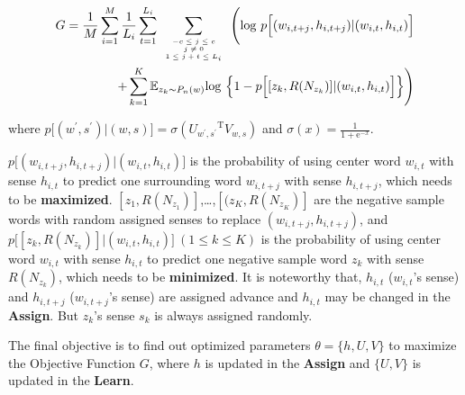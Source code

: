 \begin{equation}
\begin{split}
G = \frac{1}{M}\sum_{i=1}^M\frac{1}{L_i}\sum_{t=1}^{L_i}\sum\limits_{\mbox{\tiny$\begin{array}{c}-c\leq j \leq c\\ j\neq 0\\ 1\leq j+t\leq L_i\end{array}$}}\Bigg (\mathrm{log}\ p\Big [(w_{i,t+j},h_{i,t+j})|(w_{i,t},h_{i,t})\Big ] \\
+\sum\limits_{k=1}^K\mathbb{E}_{z_k\sim P_n(w)}\mathrm{log}\ \Big \{1-p\Big[[z_k,R(N_{z_k})]|(w_{i,t},h_{i,t})\Big ] \Big \} \Bigg )
\end{split}
\end{equation} 

where $p\Big[(w^\prime,s^\prime)|(w,s)\Big] = \sigma({U_{w^\prime,s^\prime}}^{\mathrm{T}}V_{w,s})$
 and $\sigma(x) = \frac{1}{1+\mathrm{e}^{-x}}$. 
 
 $p\Big [(w_{i,t+j},h_{i,t+j})|(w_{i,t},h_{i,t})\Big ]$ is the probability of using center word $w_{i,t}$ with sense $h_{i,t}$ to predict one surrounding word $w_{i,t+j}$ with sense $h_{i,t+j}$, which needs to be \textbf{maximized}.
$[z_1,R(N_{z_1})]$,\ldots,$[(z_K,R(N_{z_K})]$ are the negative sample words with random assigned senses to replace $(w_{i,t+j},h_{i,t+j})$, and $p\Big[[z_k,R(N_{z_k})]|(w_{i,t},h_{i,t})\Big ]\ (1\leq k\leq K)$ is the probability of using center word $w_{i,t}$ with sense $h_{i,t}$ to predict one negative sample word $z_k$ with sense $R(N_{z_k})$, which needs to be \textbf{minimized}. 
It is noteworthy that, $h_{i,t}$  ($w_{i,t}$'s sense) and $h_{i,t+j}$ ($w_{i,t+j}$'s sense) are assigned advance and $h_{i,t}$ may be changed in the \textbf{Assign}. But $z_k$'s sense $s_k$ is always assigned randomly. 

The final objective is to find out optimized parameters $\theta = \{h,U,V\}$ to maximize the Objective Function $G$, where $h$ is updated in the \textbf{Assign} and $\{U,V\}$ is updated in the \textbf{Learn}.

